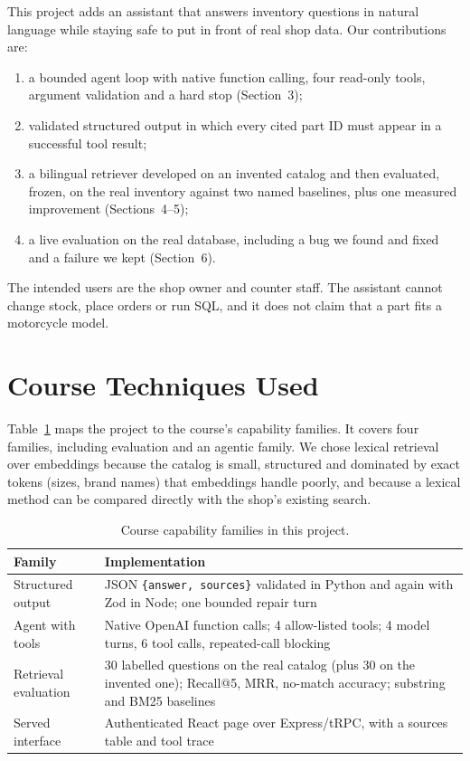 \documentclass[10pt,twocolumn,a4paper]{article}
\newcommand{\code}[1]{\texttt{#1}}
\begin{document}
This project adds an assistant that answers inventory questions in natural language while staying safe to put in front of real shop data. Our contributions are:
\begin{enumerate}
\item a bounded agent loop with native function calling, four read-only tools, argument validation and a hard stop (Section~3);
\item validated structured output in which every cited part ID must appear in a successful tool result;
\item a bilingual retriever developed on an invented catalog and then evaluated, frozen, on the real inventory against two named baselines, plus one measured improvement (Sections~4--5);
\item a live evaluation on the real database, including a bug we found and fixed and a failure we kept (Section~6).
\end{enumerate}

The intended users are the shop owner and counter staff. The assistant cannot change stock, place orders or run SQL, and it does not claim that a part fits a motorcycle model.

\section{Course Techniques Used}

Table~\ref{tab:families} maps the project to the course's capability families. It covers four families, including evaluation and an agentic family. We chose lexical retrieval over embeddings because the catalog is small, structured and dominated by exact tokens (sizes, brand names) that embeddings handle poorly, and because a lexical method can be compared directly with the shop's existing search.

\begin{table}[t]
\caption{Course capability families in this project.}
\label{tab:families}
\centering\small
\begin{tabular}{@{}p{24mm}p{55mm}@{}}
\toprule
Family & Implementation \\
\midrule
Structured output & JSON \code{\{answer, sources\}} validated in Python and again with Zod in Node; one bounded repair turn \\
Agent with tools & Native OpenAI function calls; 4 allow-listed tools; 4 model turns, 6 tool calls, repeated-call blocking \\
Retrieval evaluation & 30 labelled questions on the real catalog (plus 30 on the invented one); Recall@5, MRR, no-match accuracy; substring and BM25 baselines \\
Served interface & Authenticated React page over Express/tRPC, with a sources table and tool trace \\
\bottomrule
\end{tabular}
\end{table}
\end{document}
